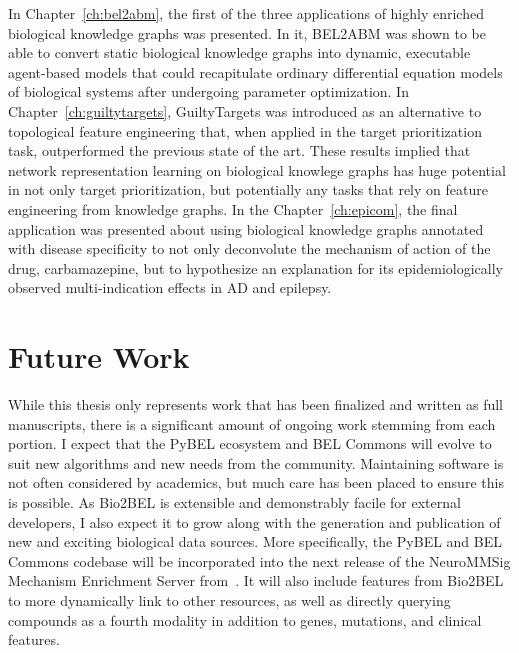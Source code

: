 In Chapter~\ref{ch:bel2abm}, the first of the three applications of highly enriched biological knowledge graphs was presented.
In it, BEL2ABM was shown to be able to convert static biological knowledge graphs into dynamic, executable agent-based models that could recapitulate ordinary differential equation models of biological systems after undergoing parameter optimization.
In Chapter~\ref{ch:guiltytargets}, GuiltyTargets was introduced as an alternative to topological feature engineering that, when applied in the target prioritization task, outperformed the previous state of the art.
These results implied that network representation learning on biological knowlege graphs has huge potential in not only target prioritization, but potentially any tasks that rely on feature engineering from knowledge graphs.
In the Chapter~\ref{ch:epicom}, the final application was presented about using biological knowledge graphs annotated with disease specificity to not only deconvolute the mechanism of action of the drug, carbamazepine, but to hypothesize an explanation for its epidemiologically observed multi-indication effects in \ac{AD} and epilepsy.

\section{Future Work}

While this thesis only represents work that has been finalized and written as full manuscripts, there is a significant amount of ongoing work stemming from each portion.
I expect that the PyBEL ecosystem and BEL Commons will evolve to suit new algorithms and new needs from the community.
Maintaining software is not often considered by academics, but much care has been placed to ensure this is possible.
As Bio2BEL is extensible and demonstrably facile for external developers, I also expect it to grow along with the generation and publication of new and exciting biological data sources.
More specifically, the PyBEL and BEL Commons codebase will be incorporated into the next release of the NeuroMMSig Mechanism Enrichment Server from~\cite{Domingo-Fernandez2017}.
It will also include features from Bio2BEL to more dynamically link to other resources, as well as directly querying compounds as a fourth modality in addition to genes, mutations, and clinical features.

